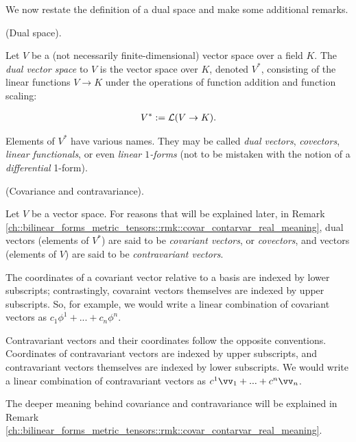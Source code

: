 We now restate the definition of a dual space and make some additional remarks.

\begin{defn}
\label{ch::motivated_intro::defn::dual_space_2}
    (Dual space). 
    
    Let $V$ be a (not necessarily finite-dimensional) vector space over a field $K$. The \textit{dual vector space} to $V$ is the vector space over $K$, denoted $V^*$, consisting of the linear functions $V \rightarrow K$ under the operations of function addition and function scaling:
    
    \begin{align*}
        V^* := \mathcal{L}(V \rightarrow K).
    \end{align*}
    
    Elements of $V^*$ have various names. They may be called \textit{dual vectors}, \textit{covectors}, \textit{linear functionals}, or even \textit{linear $1$-forms} (not to be mistaken with the notion of a \textit{differential} 1-form).
\end{defn}

\begin{defn}
\label{ch::motivated_intro::defn::covariance_contravariance}
    (Covariance and contravariance).
    
    Let $V$ be a vector space. For reasons that will be explained later, in Remark \ref{ch::bilinear_forms_metric_tensors::rmk::covar_contarvar_real_meaning}, dual vectors (elements of $V^*$) are said to be \textit{covariant vectors}, or \textit{covectors}, and vectors (elements of $V$) are said to be \textit{contravariant vectors}.
    
    The coordinates of a covariant vector relative to a basis are indexed by lower subscripts; contrastingly, covaraint vectors themselves are indexed by upper subscripts. So, for example, we would write a linear combination of covariant vectors as $c_1 \phi^1 + ... + c_n \phi^n$.
    
    Contravariant vectors and their coordinates follow the opposite conventions. Coordinates of contravariant vectors are indexed by upper subscripts, and contravariant vectors themselves are indexed by lower subscripts. We would write a linear combination of contravariant vectors as $c^1 \vv_1 + ... + c^n \vv_n$.
    
    The deeper meaning behind covariance and contravariance will be explained in Remark \ref{ch::bilinear_forms_metric_tensors::rmk::covar_contarvar_real_meaning}.
\end{defn}

